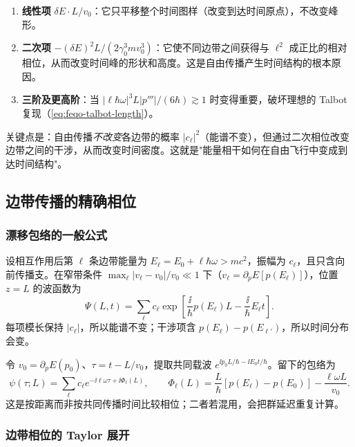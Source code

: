 \begin{enumerate}
\item \textbf{线性项} $\delta E\cdot L/v_0$：它只平移整个时间图样（改变到达时间原点），不改变峰形。
\item \textbf{二次项} $-(\delta E)^2 L/(2\gamma_0^3mv_0^3)$：它使不同边带之间获得与 $\ell^2$ 成正比的相对相位，从而改变时间峰的形状和高度。这是自由传播产生时间结构的根本原因。
\item \textbf{三阶及更高阶}：当 $|\ell\hbar\omega|^3 L|p'''|/(6\hbar)\gtrsim 1$ 时变得重要，破坏理想的 Talbot 复现（\cref{eq:feqo-talbot-length}）。
\end{enumerate}

关键点是：自由传播\emph{不改变}各边带的概率 $|c_\ell|^2$（能谱不变），但通过二次相位改变边带之间的干涉，从而改变时间密度。这就是"能量相干如何在自由飞行中变成到达时间结构"。

\subsection{边带传播的精确相位}

\subsubsection{漂移包络的一般公式}

设相互作用后第 $\ell$ 条边带能量为 $E_\ell=E_0+\ell\hbar\omega>mc^2$，振幅为 $c_\ell$，且只含向前传播支。在窄带条件 $\max_\ell|v_\ell-v_0|/v_0\ll 1$ 下（$v_\ell=\partial_pE[p(E_\ell)]$），位置 $z=L$ 的波函数为
\begin{equation}
\Psi(L,t)=\sum_\ell c_\ell
\exp\!\left[\frac{\ii}{\hbar}p(E_\ell)L
-\frac{\ii}{\hbar}E_\ell t\right].
\label{eq:feqo-exact-drift-phase}
\end{equation}
每项模长保持 $|c_\ell|$，所以能谱不变；干涉项含 $p(E_\ell)-p(E_{\ell'})$，所以时间分布会变。

令 $v_0=\partial_pE(p_0)$、$\tau=t-L/v_0$，提取共同载波 $e^{\ii p_0L/\hbar-\ii E_0t/\hbar}$。留下的包络为
\begin{equation}
\psi(\tau;L)=\sum_\ell c_\ell
e^{-\ii\ell\omega\tau+\ii\Phi_\ell(L)},\qquad
\Phi_\ell(L)=\frac{L}{\hbar}[p(E_\ell)-p(E_0)]-\frac{\ell\omega L}{v_0}.
\label{eq:feqo-drift-envelope}
\end{equation}
这是按距离而非按共同传播时间比较相位；二者若混用，会把群延迟重复计算。

\subsubsection{边带相位的 Taylor 展开}

